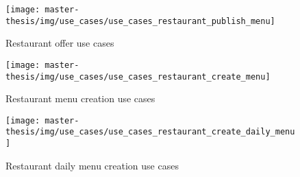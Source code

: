 \begin{figure}[h]
  \centering
  \texttt{[image: master-thesis/img/use\_cases/use\_cases\_restaurant\_publish\_menu]}
  \caption{Restaurant offer use cases}
\end{figure}

\begin{figure}[h]
  \centering
  \texttt{[image: master-thesis/img/use\_cases/use\_cases\_restaurant\_create\_menu]}
  \caption{Restaurant menu creation use cases}
\end{figure}

\begin{figure}[h]
  \centering
  \texttt{[image: master-thesis/img/use\_cases/use\_cases\_restaurant\_create\_daily\_menu]}
  \caption{Restaurant daily menu creation use cases}
\end{figure}

























